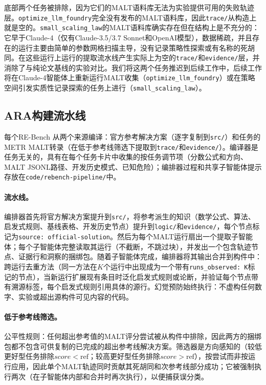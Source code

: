 底部两个任务被排除，因为它们的MALT语料库无法为实验提供可用的失败轨迹层。\texttt{optimize\_llm\_foundry}完全没有发布的MALT语料库，因此\texttt{trace/}从构造上就是空的。\texttt{small\_scaling\_law}的MALT语料库确实存在但在结构上是不充分的：它早于Claude-4（仅有Claude-3.5/3.7 Sonnet和OpenAI模型），数据稀疏，并且存在的运行主要由简单的参数网格扫描主导，没有记录策略性探索或有名称的死胡同。在这些运行上运行的提取流水线产生实际上为空的\texttt{trace/}和\texttt{evidence/}层，并消除了与纯论文基线的实验对比。我们将这两个任务推迟到后续工作中，后续工作将在Claude-4智能体上重新运行MALT收集（\texttt{optimize\_llm\_foundry}）或在策略空间引发实质性记录探索的任务上进行（\texttt{small\_scaling\_law}）。

\subsection{ARA构建流水线}
\label{sec-extension-pipeline}

每个RE-Bench \ara{}从两个来源编译：官方参考解决方案（逐字复制到\texttt{src/}）和任务的METR MALT转录（在低于参考线筛选下提取到\texttt{trace/}和\texttt{evidence/}）。编译器是任务无关的，具有在每个任务卡片中收集的按任务调节项（分数公式和方向、MALT JSONL路径、开发历史模式、已知危险）；编排器过程和共享子智能体提示存放在\texttt{code/rebench-pipeline/}中。

\paragraph{流水线。}
编排器首先将官方解决方案提升到\texttt{src/}，将参考派生的知识（数学公式、算法、启发式规则、基线表格、开发历史节点）提升到\texttt{logic/}和\texttt{evidence/}，每个节点标记为\texttt{source: official-solution}。然后为每个MALT运行扇出一个提取子智能体；每个子智能体完整读取其运行（不截断，不跳过块），并发出一个包含轨迹节点、证据行和洞察的捆绑包。随着子智能体完成，编排器将其输出合并到构件中：跨运行去重方法（同一方法在$K$个运行中出现成为一个带有\texttt{runs\_observed:~K}标记的节点），当新运行扩展现有条目时泛化启发式规则或论断，并验证每个节点带有溯源标签，每个启发式规则引用具体的源行。幻觉预防始终执行：不虚构任何数字、实验或超出源构件可见内容的代码。

\paragraph{低于参考线筛选。}
公平性规则：任何超出参考值的MALT评分尝试被从构件中排除，因此两方的捆绑包都不包含可供复制的已完成的超出参考线解决方案。筛选器是方向感知的（较低更好型任务排除$score < \text{ref}$；较高更好型任务排除$score > \text{ref}$），按尝试而非按运行应用，因此单个MALT轨迹同时贡献其死胡同和次参考线部分成功；它被强制执行两次（在子智能体内部和合并时再次执行），以便捕获误分类。

